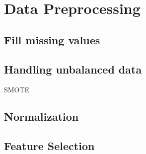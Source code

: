 \section{Data Preprocessing}
\subsection{Fill missing values}

\subsection{Handling unbalanced data}
SMOTE

\subsection{Normalization}

\subsection{}

\subsection{Feature Selection}
